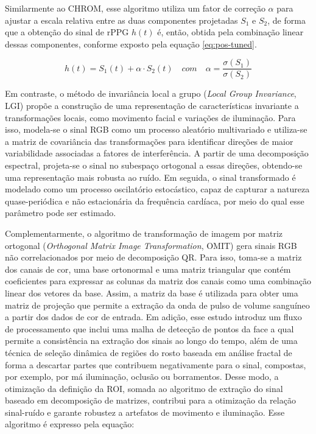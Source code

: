 Similarmente ao CHROM, esse algoritmo utiliza um fator de correção \(\alpha\) para ajustar a escala relativa entre as duas componentes projetadas \(S_1\) e \(S_2\), de forma que a obtenção do sinal de rPPG \(h(t)\) é, então, obtida pela combinação linear dessas componentes, conforme exposto pela equação \ref{eq:pos-tuned}.

\begin{equation}
\label{eq:pos-tuned}
    h(t) = S_1(t) + \alpha \cdot S_2(t) \quad com \quad \alpha = \frac{\sigma(S_1)}{\sigma(S_2)}
\end{equation}

Em contraste, o método de invariância local a grupo (\textit{Local Group Invariance}, LGI) \cite{pilz2018local} propõe a construção de uma representação de características invariante a transformações locais, como movimento facial e variações de iluminação. Para isso, modela-se o sinal RGB como um processo aleatório multivariado e utiliza-se a matriz de covariância das transformações para identificar direções de maior variabilidade associadas a fatores de interferência. A partir de uma decomposição espectral, projeta-se o sinal no subespaço ortogonal a essas direções, obtendo-se uma representação mais robusta ao ruído. Em seguida, o sinal transformado é modelado como um processo oscilatório estocástico, capaz de capturar a natureza quase-periódica e não estacionária da frequência cardíaca, por meio do qual esse parâmetro pode ser estimado. 

Complementarmente, o algoritmo de transformação de imagem por matriz ortogonal (\textit{Orthogonal Matrix Image Transformation}, OMIT) \cite{casado2023face2ppg} gera sinais RGB não correlacionados por meio de decomposição QR. Para isso, toma-se a matriz dos canais de cor, uma base ortonormal e uma matriz triangular que contém coeficientes para expressar as colunas da matriz dos canais como uma combinação linear dos vetores da base. Assim, a matriz da base é utilizada para obter uma matriz de projeção que permite a extração da onda de pulso de volume sanguíneo a partir dos dados de cor de entrada. Em adição, esse estudo introduz um fluxo de processamento que inclui uma malha de detecção de pontos da face a qual permite a consistência na extração dos sinais ao longo do tempo, além de uma técnica de seleção dinâmica de regiões do rosto baseada em análise fractal de forma a descartar partes que contribuem negativamente para o sinal, compostas, por exemplo, por má iluminação, oclusão ou borramentos. Desse modo, a otimização da definição da ROI, somada ao algoritmo de extração do sinal baseado em decomposição de matrizes, contribui para a otimização da relação sinal-ruído e garante robustez a artefatos de movimento e iluminação. Esse algoritmo é expresso pela equação:

